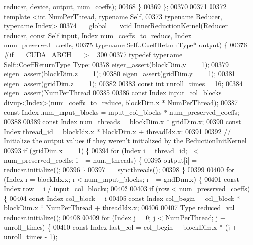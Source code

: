 \begin{DoxyCode}
      reducer, device, output, num\_coeffs);
00368   \}
00369 \};
00370 
00371 
00372 \textcolor{keyword}{template} <\textcolor{keywordtype}{int} NumPerThread, \textcolor{keyword}{typename} Self,
00373           \textcolor{keyword}{typename} Reducer, \textcolor{keyword}{typename} Index>
00374 \_\_global\_\_ \textcolor{keywordtype}{void} InnerReductionKernel(Reducer reducer, \textcolor{keyword}{const} Self input, Index num\_coeffs\_to\_reduce, Index 
      num\_preserved\_coeffs,
00375                                          \textcolor{keyword}{typename} Self::CoeffReturnType* output) \{
00376 \textcolor{preprocessor}{#if \_\_CUDA\_ARCH\_\_ >= 300}
00377   \textcolor{keyword}{typedef} \textcolor{keyword}{typename} Self::CoeffReturnType Type;
00378   eigen\_assert(blockDim.y == 1);
00379   eigen\_assert(blockDim.z == 1);
00380   eigen\_assert(gridDim.y == 1);
00381   eigen\_assert(gridDim.z == 1);
00382 
00383   \textcolor{keyword}{const} \textcolor{keywordtype}{int} unroll\_times = 16;
00384   eigen\_assert(NumPerThread %
00385 
00386   \textcolor{keyword}{const} Index input\_col\_blocks = divup<Index>(num\_coeffs\_to\_reduce, blockDim.x * NumPerThread);
00387   \textcolor{keyword}{const} Index num\_input\_blocks = input\_col\_blocks * num\_preserved\_coeffs;
00388 
00389   \textcolor{keyword}{const} Index num\_threads = blockDim.x * gridDim.x;
00390   \textcolor{keyword}{const} Index thread\_id = blockIdx.x * blockDim.x + threadIdx.x;
00391 
00392   \textcolor{comment}{// Initialize the output values if they weren't initialized by the ReductionInitKernel}
00393   \textcolor{keywordflow}{if} (gridDim.x == 1) \{
00394     \textcolor{keywordflow}{for} (Index i = thread\_id; i < num\_preserved\_coeffs; i += num\_threads) \{
00395       output[i] = reducer.initialize();
00396     \}
00397     \_\_syncthreads();
00398   \}
00399 
00400   \textcolor{keywordflow}{for} (Index i = blockIdx.x; i < num\_input\_blocks; i += gridDim.x) \{
00401     \textcolor{keyword}{const} Index row = i / input\_col\_blocks;
00402 
00403     \textcolor{keywordflow}{if} (row < num\_preserved\_coeffs) \{
00404       \textcolor{keyword}{const} Index col\_block = i %
00405       \textcolor{keyword}{const} Index col\_begin = col\_block * blockDim.x * NumPerThread + threadIdx.x;
00406 
00407       Type reduced\_val = reducer.initialize();
00408 
00409       \textcolor{keywordflow}{for} (Index j = 0; j < NumPerThread; j += unroll\_times) \{
00410         \textcolor{keyword}{const} Index last\_col = col\_begin + blockDim.x * (j + unroll\_times - 1);

\end{DoxyCode}
